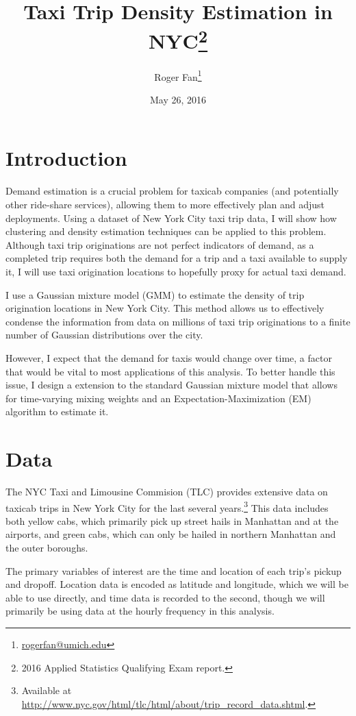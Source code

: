 \documentclass[12pt]{article}
\theoremstyle{definition}
\theoremstyle{algodesc}
\begin{document}
\title{Taxi Trip Density Estimation in NYC\thanks{2016 Applied Statistics Qualifying Exam report.}}
\author{
    Roger Fan\footnote{\url{rogerfan@umich.edu}}
}
\date{May 26, 2016}

\maketitle


\section{Introduction}
Demand estimation is a crucial problem for taxicab companies (and potentially other ride-share services), allowing them to more effectively plan and adjust deployments. Using a dataset of New York City taxi trip data, I will show how clustering and density estimation techniques can be applied to this problem. Although taxi trip originations are not perfect indicators of demand, as a completed trip requires both the demand for a trip and a taxi available to supply it, I will use taxi origination locations to hopefully proxy for actual taxi demand.

I use a Gaussian mixture model (GMM) to estimate the density of trip origination locations in New York City. This method allows us to effectively condense the information from data on millions of taxi trip originations to a finite number of Gaussian distributions over the city.

However, I expect that the demand for taxis would change over time, a factor that would be vital to most applications of this analysis. To better handle this issue, I design a extension to the standard Gaussian mixture model that allows for time-varying mixing weights and an Expectation-Maximization (EM) algorithm to estimate it.


\section{Data}
The NYC Taxi and Limousine Commision (TLC) provides extensive data on taxicab trips in New York City for the last several years.\footnote{Available at \url{http://www.nyc.gov/html/tlc/html/about/trip_record_data.shtml}.} This data includes both yellow cabs, which primarily pick up street hails in Manhattan and at the airports, and green cabs, which can only be hailed in northern Manhattan and the outer boroughs.

The primary variables of interest are the time and location of each trip's pickup and dropoff. Location data is encoded as latitude and longitude, which we will be able to use directly, and time data is recorded to the second, though we will primarily be using data at the hourly frequency in this analysis.
\end{document}

